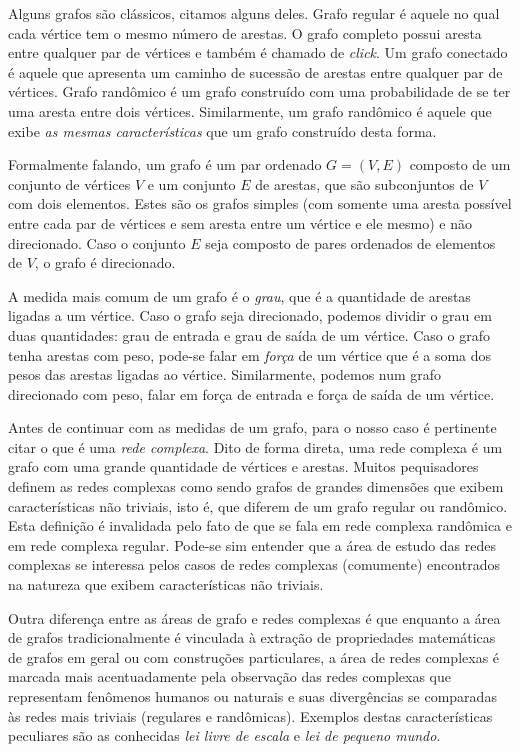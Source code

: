\documentclass[12pt]{article}
\begin{document}
Alguns grafos são clássicos, citamos alguns deles. Grafo regular é aquele no qual cada vértice tem o mesmo número de arestas. O grafo completo possui aresta entre qualquer par de vértices e também é chamado de \emph{click}. Um grafo conectado é aquele que apresenta um caminho de sucessão de arestas entre qualquer par de vértices. Grafo randômico é um grafo construído com uma probabilidade de se ter uma aresta entre dois vértices. Similarmente, um grafo randômico é aquele que exibe \emph{as mesmas características} que um grafo construído desta forma.

Formalmente falando, um grafo é um par ordenado $G=(V,E)$ composto de um conjunto de vértices $V$ e um conjunto $E$ de arestas, que são subconjuntos de $V$ com dois elementos. Estes são os grafos simples (com somente uma aresta possível entre cada par de vértices e sem aresta entre um vértice e ele mesmo) e não direcionado. Caso o conjunto $E$ seja composto de pares ordenados de elementos de $V$, o grafo é direcionado.

A medida mais comum de um grafo é o \emph{grau}, que é a quantidade de arestas ligadas a um vértice. Caso o grafo seja direcionado, podemos dividir o grau em duas quantidades: grau de entrada e grau de saída de um vértice. Caso o grafo tenha arestas com peso, pode-se falar em \emph{força} de um vértice que é a soma dos pesos das arestas ligadas ao vértice. Similarmente, podemos num grafo direcionado com peso, falar em força de entrada e força de saída de um vértice.

Antes de continuar com as medidas de um grafo, para o nosso caso é pertinente citar o que é uma \emph{rede complexa}. Dito de forma direta, uma rede complexa é um grafo com uma grande quantidade de vértices e arestas. Muitos pequisadores definem as redes complexas como sendo grafos de grandes dimensões que exibem características não triviais, isto é, que diferem de um grafo regular ou randômico. Esta definição é invalidada pelo fato de que se fala em rede complexa randômica e em rede complexa regular. Pode-se sim entender que a área de estudo das redes complexas se interessa pelos casos de redes complexas (comumente) encontrados na natureza que exibem características não triviais. 

Outra diferença entre as áreas de grafo e redes complexas é que enquanto a área de grafos tradicionalmente é vinculada à extração de propriedades matemáticas de grafos em geral ou com construções particulares, a área de redes complexas é marcada mais acentuadamente pela observação das redes complexas que representam fenômenos humanos ou naturais e suas divergências se comparadas às redes mais triviais (regulares e randômicas). Exemplos destas características peculiares são as conhecidas \emph{lei livre de escala} e \emph{lei de pequeno mundo}.
\end{document}

